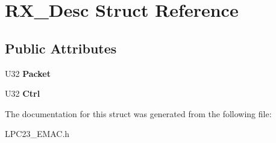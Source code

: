 \hypertarget{struct_r_x___desc}{
\section{RX\_\-Desc Struct Reference}
\label{struct_r_x___desc}
}
\subsection*{Public Attributes}
\begin{DoxyCompactItemize}
\item 
\hypertarget{struct_r_x___desc_ab850a46e12defd9ebfff268974a4c93e}{
U32 {\bfseries Packet}}
\label{struct_r_x___desc_ab850a46e12defd9ebfff268974a4c93e}

\item 
\hypertarget{struct_r_x___desc_a8ab63c3551dd02da2cfa8102eb66b40d}{
U32 {\bfseries Ctrl}}
\label{struct_r_x___desc_a8ab63c3551dd02da2cfa8102eb66b40d}

\end{DoxyCompactItemize}


The documentation for this struct was generated from the following file:\begin{DoxyCompactItemize}
\item 
LPC23\_\-EMAC.h\end{DoxyCompactItemize}
